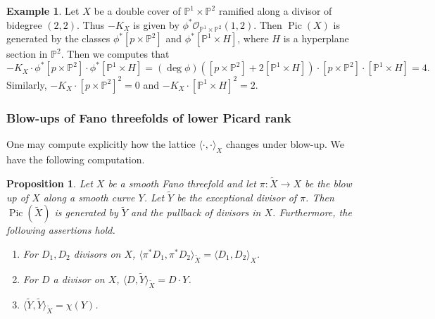 \documentclass[10pt]{amsart}
\numberwithin{equation}{section}
\theoremstyle{plain}
\newtheorem{proposition}[theorem]{Proposition}
\theoremstyle{definition}
\newtheorem{example}[theorem]{Example}
\theoremstyle{remark}
\DeclareMathOperator{\Pic}{Pic}
\begin{document}
\begin{example}
  Let \(X\) be a double cover of \(\mathbb{P}^1 \times \mathbb{P}^2\)  ramified along a divisor of bidegree \((2,2)\). Thus \(-K_X\) is given by \(\phi^* \mathcal{O}_{\mathbb{P}^1 \times \mathbb{P}^2}(1,2)\). Then \(\Pic(X)\) is generated by the classes \(\phi^*[p \times \mathbb{P}^2]\) and \(\phi^*[\mathbb{P}^1 \times H]\), where \(H\) is a hyperplane section in \(\mathbb{P}^2\). Then we computes that
  \[
    -K_X\cdot \phi^*[p\times \mathbb{P}^2] \cdot \phi^*[\mathbb{P}^1 \times H]  = (\deg \phi)([p\times \mathbb{P}^2] + 2[\mathbb{P}^1 \times H])\cdot [p\times \mathbb{P}^2] \cdot [\mathbb{P}^1 \times H] = 4.
  \]
  Similarly, \(-K_X \cdot [p \times \mathbb{P}^2]^2 = 0\) and \(-K_X \cdot [\mathbb{P}^1 \times H]^2 = 2\).
\end{example}

\subsubsection{Blow-ups of Fano threefolds of lower Picard rank}

One may compute explicitly how the lattice \(\langle \cdot, \cdot \rangle_X\) changes under blow-up. We have the following computation.

\begin{proposition}\label{proposition:blupform}
  Let \(X\) be a smooth Fano threefold and let \(\pi:\widetilde{X}\rightarrow {X}\) be the blow up of \(X\) along a smooth curve \(Y\). Let \(\widetilde{Y}\) be the exceptional divisor of \(\pi\). Then \(\Pic(\widetilde{X})\) is generated by \(\widetilde{Y}\) and the pullback of divisors in \(X\). Furthermore, the following assertions hold.
  \begin{enumerate}
  \item For \(D_1,D_2\) divisors on \(X\), \(\langle \pi^*D_1, \pi^*D_2 \rangle_{\widetilde{X}} = \langle D_1,D_2 \rangle_X\).
  \item For \(D\) a divisor on \(X\), \(\langle D,\widetilde{Y} \rangle_{\widetilde{X}} = D \cdot Y\).
  \item \(\langle \widetilde{Y},\widetilde{Y} \rangle_{\widetilde{X}} = \chi(Y)\).
  \end{enumerate}
\end{proposition}
\end{document}

